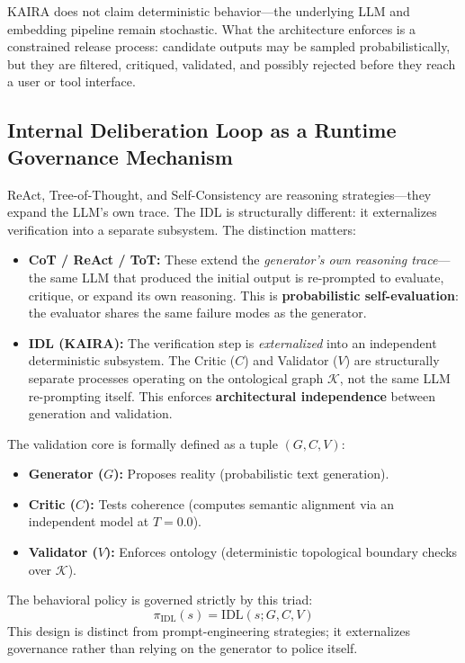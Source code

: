 \documentclass[11pt,a4paper]{article}
\begin{document}
KAIRA does not claim deterministic behavior---the underlying LLM and embedding pipeline remain stochastic. What the architecture enforces is a constrained release process: candidate outputs may be sampled probabilistically, but they are filtered, critiqued, validated, and possibly rejected before they reach a user or tool interface.

\subsection{Internal Deliberation Loop as a Runtime Governance Mechanism}
ReAct, Tree-of-Thought, and Self-Consistency are reasoning strategies---they expand the LLM's own trace. The IDL is structurally different: it externalizes verification into a separate subsystem. The distinction matters:

\begin{itemize}
    \item \textbf{CoT / ReAct / ToT:} These extend the \textit{generator's own reasoning trace}---the same LLM that produced the initial output is re-prompted to evaluate, critique, or expand its own reasoning. This is \textbf{probabilistic self-evaluation}: the evaluator shares the same failure modes as the generator.
    \item \textbf{IDL (KAIRA):} The verification step is \textit{externalized} into an independent deterministic subsystem. The Critic ($C$) and Validator ($V$) are structurally separate processes operating on the ontological graph $\mathcal{K}$, not the same LLM re-prompting itself. This enforces \textbf{architectural independence} between generation and validation.
\end{itemize}

The validation core is formally defined as a tuple $(G, C, V)$:
\begin{itemize}
    \item \textbf{Generator ($G$):} Proposes reality (probabilistic text generation).
    \item \textbf{Critic ($C$):} Tests coherence (computes semantic alignment via an independent model at $T{=}0.0$).
    \item \textbf{Validator ($V$):} Enforces ontology (deterministic topological boundary checks over $\mathcal{K}$).
\end{itemize}
The behavioral policy is governed strictly by this triad:
\begin{equation}
\pi_{\text{IDL}}(s) = \text{IDL}(s;G,C,V)
\end{equation}
This design is distinct from prompt-engineering strategies; it externalizes governance rather than relying on the generator to police itself.
\end{document}
